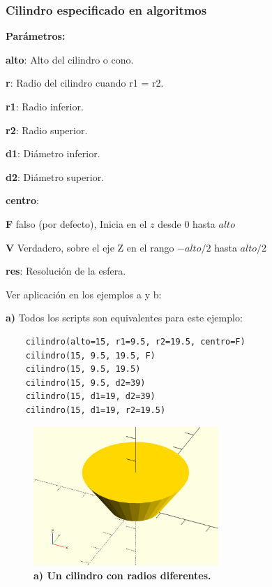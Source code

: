 \clearpage
\subsubsection{Cilindro especificado en algoritmos}
\begin{description}
\item  \textbf{Parámetros:}
\item  \textbf{alto}: Alto del cilindro o cono.
\item  \textbf{r}: Radio del cilindro cuando r1 = r2.
\item  \textbf{r1}: Radio inferior.
\item  \textbf{r2}: Radio superior.
\item  \textbf{d1}: Diámetro inferior.
\item  \textbf{d2}: Diámetro superior.
\item   \textbf{centro}:
\begin{description}
\item \textbf{F} falso (por defecto), Inicia en el $z$ desde $0$ hasta $alto$
\item \textbf{V} Verdadero, sobre el eje Z en el rango $-alto/2$ hasta $alto/2$

\end{description}
\item \textbf{res}: Resolución de la esfera.
\end{description}

Ver aplicación en los ejemplos a y b:

\textbf{a)} Todos los scripts son equivalentes para este ejemplo:


\begin{verbatim}
    cilindro(alto=15, r1=9.5, r2=19.5, centro=F)
    cilindro(15, 9.5, 19.5, F)
    cilindro(15, 9.5, 19.5)
    cilindro(15, 9.5, d2=39)
    cilindro(15, d1=19, d2=39)
    cilindro(15, d1=19, r2=19.5)
\end{verbatim}


\begin{figure}[h]
\includegraphics[width=7cm]{Img/Modelos/modelado5.jpg}
\centering
\caption{\textbf{a) \footnotesize{Un cilindro con radios diferentes. }}}
\end{figure}

